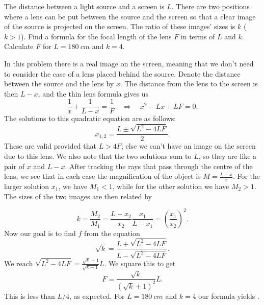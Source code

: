 \documentclass[../TST.tex]{subfiles}
\begin{document}
\begin{pproblem}
The distance between a light source and a screen is $L$. There are two positions where a lens can be put between the source and the screen so that a clear image of the source is projected on the screen. The ratio of these images' sizes is $k$ ($k>1$). Find a formula for the focal length of the lens $F$ in terms of $L$ and $k$. Calculate $F$ for $L=\qty{180}{cm}$ and $k=4$.
\end{pproblem}

\ifprob \else
\begin{solution} In this problem there is a real image on the screen, meaning that we don't need to consider the case of a lens placed behind the source. Denote the distance between the source and the lens by $x$. The distance from the lens to the screen is then $L-x$, and the thin lens formula gives us
	\begin{equation*}
\frac{1}{x}+\frac{1}{L-x}=\frac{1}{F}\quad\Rightarrow\quad x^2-Lx+LF=0.
	\end{equation*}
The solutions to this quadratic equation are as follows: 
\begin{equation*}
	x_{1,2}=\frac{L\pm\sqrt{L^2-4LF}}{2}
.
\end{equation*}
These are valid provided that $L>4F$; else we can't have an image on the screen due to this lens. We also note that the two solutions sum to $L$, so they are like a pair of $x$ and $L-x$. After tracking the rays that pass through the centre of the lens, we see that in each case the magnification of the object is $M=\frac{L-x}{x}$. For the larger solution $x_1$, we have $M_1<1$, while for the other solution we have $M_2>1$. The sizes of the two images are then related by

\begin{equation*}
k=\frac{M_2}{M_1}=\frac{L-x_2}{x_2}\frac{x_1}{L-x_1}=\left(\frac{x_1}{x_2}\right)^2 
.
\end{equation*}
Now our goal is to find $f$ from the equation
\begin{equation*}
	\sqrt{k}=\frac{L+\sqrt{L^2-4LF}}{L-\sqrt{L^2-4LF}}
.
\end{equation*}
We reach $\sqrt{L^2-4LF}=\frac{\sqrt{k}-1}{\sqrt{k+1}}L$. We square this to get
\begin{equation*}
	\boxed{F=\frac{\sqrt{k}}{(\sqrt{k}+1)^2}L.}
\end{equation*}
This is less than $L/4$, as expected. For $L=\qty{180}{cm}$ and $k=4$ our formula yields .
\end{solution}
\fi
\end{document}
